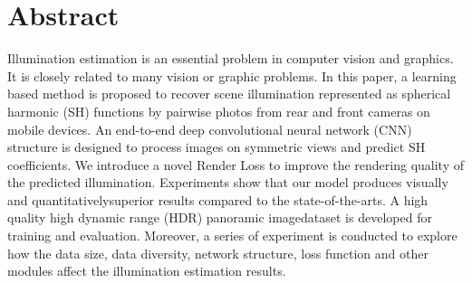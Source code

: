 \chapter*{Abstract}%
Illumination estimation is an essential problem in computer vision and graphics. It is closely related to many vision or graphic problems. In this paper, a learning based method is proposed to recover scene illumination represented as spherical harmonic (SH) functions by pairwise photos from rear and front cameras on mobile devices. An end-to-end deep convolutional neural network (CNN) structure is designed to process images on symmetric views and predict SH coefficients. We introduce a novel Render Loss to improve the rendering quality of the predicted illumination. Experiments show that our model produces visually and quantitativelysuperior results compared to the state-of-the-arts. A high quality high dynamic range (HDR) panoramic imagedataset is developed for training and evaluation. Moreover, a series of experiment is conducted to explore how the data size, data diversity, network structure, loss function and other modules affect the illumination  estimation results.

